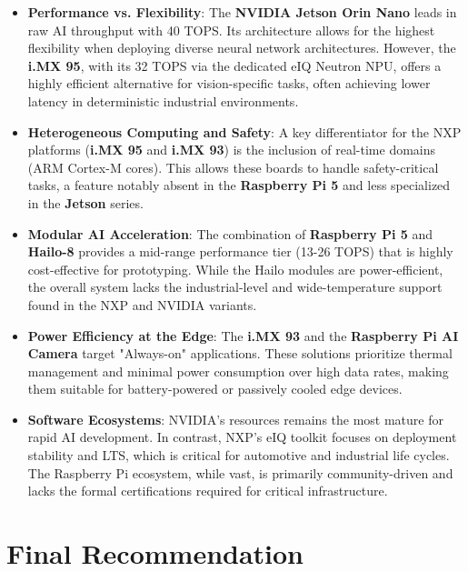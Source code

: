 \begin{itemize}
    \item \textbf{Performance vs. Flexibility}: The \textbf{NVIDIA Jetson Orin Nano} leads in raw \gls{AI} throughput with 40 \gls{TOPS}. Its architecture allows for the highest flexibility when deploying diverse neural network architectures. However, the \textbf{i.MX 95}, with its 32 \gls{TOPS} via the dedicated eIQ Neutron \gls{NPU}, offers a highly efficient alternative for vision-specific tasks, often achieving lower latency in deterministic industrial environments.
    
    \item \textbf{Heterogeneous Computing and Safety}: A key differentiator for the NXP platforms (\textbf{i.MX 95} and \textbf{i.MX 93}) is the inclusion of real-time domains (\gls{ARM} Cortex-M cores). This allows these boards to handle safety-critical tasks, a feature notably absent in the \textbf{Raspberry Pi 5} and less specialized in the \textbf{Jetson} series.
    
    \item \textbf{Modular \gls{AI} Acceleration}: The combination of \textbf{Raspberry Pi 5} and \textbf{Hailo-8} provides a mid-range performance tier (13-26 \gls{TOPS}) that is highly cost-effective for prototyping. While the Hailo modules are power-efficient, the overall system lacks the industrial-level and wide-temperature support found in the NXP and NVIDIA variants.
    
    \item \textbf{Power Efficiency at the Edge}: The \textbf{i.MX 93} and the \textbf{Raspberry Pi \gls{AI} Camera} target "Always-on" applications. These solutions prioritize thermal management and minimal power consumption over high data rates, making them suitable for battery-powered or passively cooled edge devices.
    
    \item \textbf{Software Ecosystems}: NVIDIA's resources remains the most mature for rapid \gls{AI} development. In contrast, NXP's eIQ toolkit focuses on deployment stability and \gls{LTS}, which is critical for automotive and industrial life cycles. The Raspberry Pi ecosystem, while vast, is primarily community-driven and lacks the formal certifications required for critical infrastructure.
\end{itemize}

\section{Final Recommendation}

